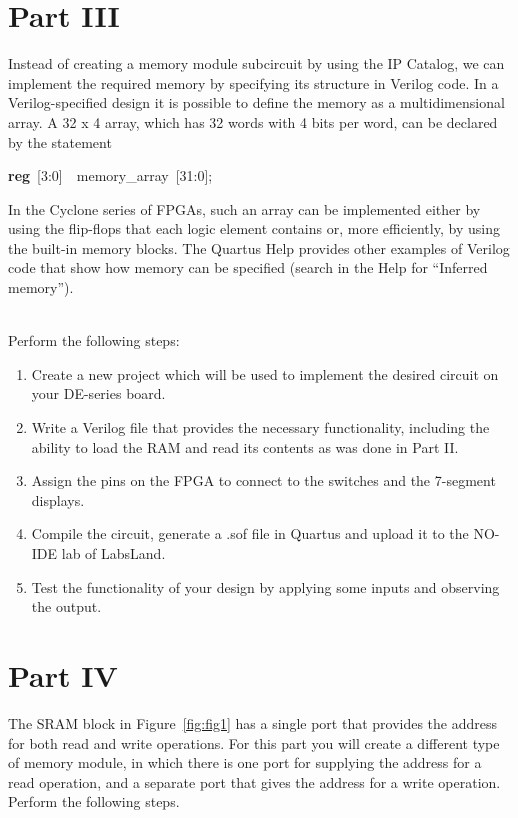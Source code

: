 \documentclass[epsfig,10pt,fullpage]{article}
\begin{document}
\section*{Part III}
Instead of creating a memory module subcircuit by using the IP Catalog, we can implement the 
required memory by specifying its structure in Verilog code.
In a Verilog-specified design it is possible to define the memory as a
multidimensional array. A 32 {\sf x} 4 array, which has 32 words with
4 bits per word, can be declared by the statement

\begin{center}
{\bf reg}~[3:0]~~memory\_array~[31:0];
\end{center}

In the Cyclone series of FPGAs, such an array can be implemented either by using
the flip-flops that each logic element contains or, more efficiently, 
by using the built-in memory blocks.
The Quartus Help provides other examples of Verilog code 
that show how memory can be specified (search in the Help for ``Inferred memory''). 

~\\
Perform the following steps:

\begin{enumerate}
\item Create a new project which will be used to implement the desired
circuit on your DE-series board.
\item Write a Verilog file that provides the necessary functionality,
including the ability to load the RAM and read its contents as was done in
Part II.
\item Assign the pins on the FPGA to connect to the switches and the 
7-segment displays.
\item Compile the circuit, generate a .sof file in Quartus and upload it to the NO-IDE lab of LabsLand.
\item Test the functionality of your design by applying some inputs
and observing the output.
\end{enumerate}

\section*{Part IV}
The SRAM block in Figure~\ref{fig:fig1} has a single port that provides the address for 
both read and write operations. For this part you will create a different type of memory module,
in which there is one port for supplying the address for a read operation, and a separate
port that gives the address for a write operation. Perform the following steps.
\end{document}

